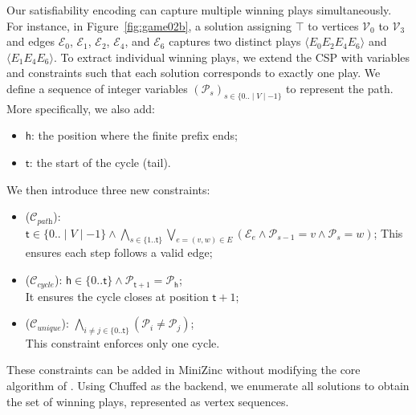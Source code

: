 \documentclass[runningheads]{llncs}
\begin{document}
Our satisfiability encoding can capture multiple winning plays simultaneously. For instance, in Figure~\ref{fig:game02b}, a solution assigning $\top$ to vertices $\mathcal{V}_0$ to $\mathcal{V}_3$ and edges $\mathcal{E}_0$, $\mathcal{E}_1$, $\mathcal{E}_2$, $\mathcal{E}_4$, and $\mathcal{E}_6$ captures two distinct plays $\langle E_0E_2E_4E_6 \rangle$ and $\langle E_1E_4E_6 \rangle$.
%
To extract individual winning plays, we extend the CSP with variables and constraints such that each solution corresponds to exactly one play. We define a sequence of integer variables $(\mathcal{P}_s)_{s \in \{0..\mid V \mid - 1\}}$ to represent the path. More specifically, we also add:
\begin{itemize}
\item $\mathsf{h}$: the position where the finite prefix ends;

\item $\mathsf{t}$: the start of the cycle (tail).
\end{itemize} 

\noindent 
We then introduce three new constraints:
\begin{itemize}
\item ($\mathcal{C}_{\textit{path}}$): 
$\mathsf{t} \in \{0..\mid V \mid -1\} \wedge \bigwedge_{s \in \{1..\mathsf{t}\}} \bigvee_{e=(v,w) \in E} (\mathcal{E}_e \wedge \mathcal{P}_{s-1} = v \wedge \mathcal{P}_s = w)$;
This ensures each step follows a valid edge;
\end{itemize}

\begin{itemize}
\item ($\mathcal{C}_{\textit{cycle}}$): 
$\mathsf{h} \in \{0..\mathsf{t}\} \wedge \mathcal{P}_{\mathsf{t}+1} = \mathcal{P}_\mathsf{h}$; \\
It ensures the cycle closes at position $\mathsf{t} + 1$;
\end{itemize}

\begin{itemize}
\item ($\mathcal{C}_{\textit{unique}}$): 
$\bigwedge_{i \neq j \in \{0..\mathsf{t}\}} (\mathcal{P}_i \neq \mathcal{P}_j)$; \\
This constraint enforces only one cycle.
\end{itemize} 

These constraints can be added in MiniZinc without modifying the core algorithm of \noc. Using Chuffed as the backend, we enumerate all solutions to obtain the set of winning plays, represented as vertex sequences. 
\end{document}
